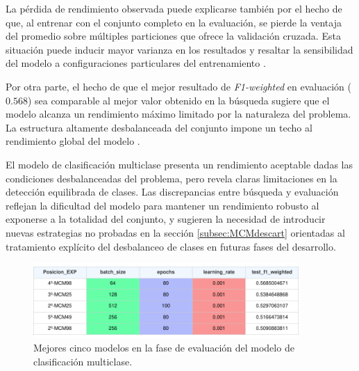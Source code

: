 La pérdida de rendimiento observada puede explicarse también por el hecho de que, al entrenar con el conjunto completo en la evaluación, se pierde la ventaja del promedio sobre múltiples particiones que ofrece la validación cruzada. Esta situación puede inducir mayor varianza en los resultados y resaltar la sensibilidad del modelo a configuraciones particulares del entrenamiento \cite{dietterich1998approx}.

Por otra parte, el hecho de que el mejor resultado de \textit{F1-weighted} en evaluación ($0{.}568$) sea comparable al mejor valor obtenido en la búsqueda sugiere que el modelo alcanza un rendimiento máximo limitado por la naturaleza del problema. La estructura altamente desbalanceada del conjunto impone un techo al rendimiento global del modelo \cite{japkowicz2002class}.

El modelo de clasificación multiclase presenta un rendimiento aceptable dadas las condiciones desbalanceadas del problema, pero revela claras limitaciones en la detección equilibrada de clases. Las discrepancias entre búsqueda y evaluación reflejan la dificultad del modelo para mantener un rendimiento robusto al exponerse a la totalidad del conjunto, y sugieren la necesidad de introducir nuevas estrategias no probadas en la sección \ref{subsec:MCMdescart}  orientadas al tratamiento explícito del desbalanceo de clases en futuras fases del desarrollo.

\begin{figure}[H]
    \centering
    \includegraphics[width=0.9\textwidth]{./img/evaluacion/resultados/top5EVALMCM.pdf}
    \caption{Mejores cinco modelos en la fase de evaluación del modelo de clasificación multiclase.}
    \label{fig:top5EVALMCM}
\end{figure}

